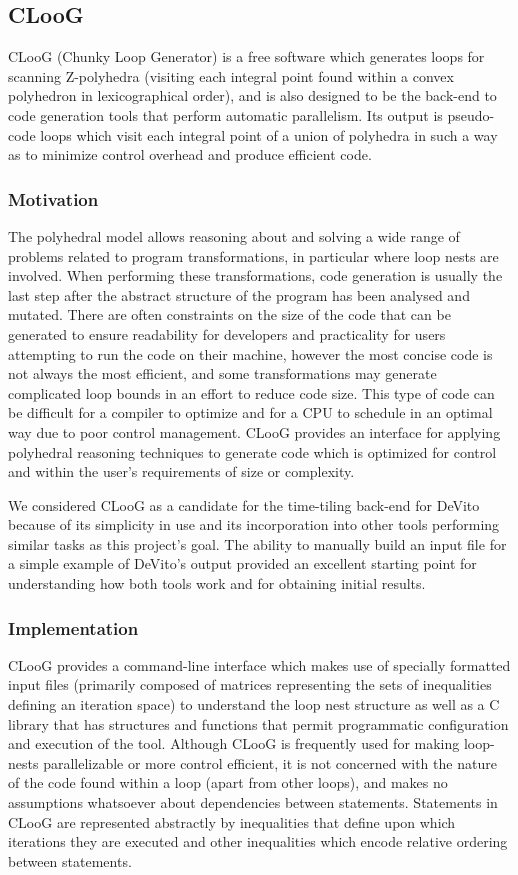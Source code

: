 \documentclass[a4paper,12pt,twoside]{report}
\begin{document}
\begin{itemize}
\subsection{CLooG}
CLooG (Chunky Loop Generator) is a free software which generates loops for scanning Z-polyhedra (visiting each integral
point found within a convex polyhedron in lexicographical order), and is also designed to be
the back-end to code generation tools that perform automatic parallelism. Its output is pseudo-code loops which visit
each integral point of a union of polyhedra in such a way as to minimize control overhead and produce efficient code.

\subsubsection{Motivation}
The polyhedral model allows reasoning about and solving a wide range of problems related to program transformations,
in particular where loop nests are involved. When performing these transformations, code generation is usually the last
step after the abstract structure of the program has been analysed and mutated. There are often constraints on the size of the code
that can be generated to ensure readability for developers and practicality for users attempting to run the code on their machine,
however the most concise code is not always the most efficient, and some transformations may generate complicated loop bounds in an effort
to reduce code size. This type of code can be difficult for a compiler to optimize and for a CPU to schedule in an optimal way due to
poor control management. CLooG provides an interface for applying polyhedral reasoning techniques to generate code which is optimized for control
and within the user's requirements of size or complexity.

We considered CLooG as a candidate for the time-tiling back-end for DeVito because of its simplicity in use and its incorporation into
other tools performing similar tasks as this project's goal. The ability to manually build an input file for a simple example of DeVito's
output provided an excellent starting point for understanding how both tools work and for obtaining initial results.
\subsubsection{Implementation}
CLooG provides a command-line interface which makes use of specially formatted input files (primarily composed of matrices representing
the sets of inequalities defining an iteration space) to understand the loop nest structure as well as a C library that has structures and
functions that permit programmatic configuration and execution of the tool.
Although CLooG is frequently used for making loop-nests parallelizable or more control efficient, it is not concerned with the nature of the
code found within a loop (apart from other loops), and makes no assumptions whatsoever about dependencies between statements.
Statements in CLooG are represented abstractly by inequalities that define upon which iterations they are executed and other inequalities
which encode relative ordering between statements.


\end{itemize}
\end{document}
